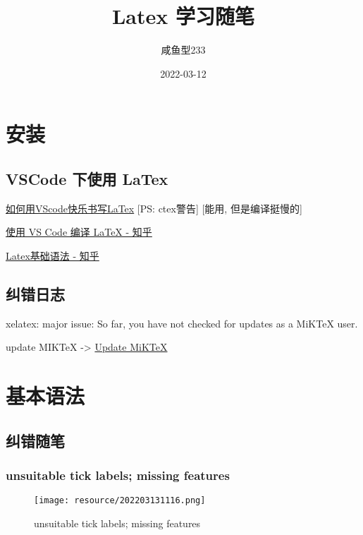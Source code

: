 \documentclass{UJSBachelor} %
\title{Latex 学习随笔}
\author{咸鱼型233}
\date{2022-03-12}
\begin{document}
\maketitle  %
\tableofcontents

\chapter{安装}
\section{VSCode 下使用 LaTex}
\href{https://zhuanlan.zhihu.com/p/337813181}{如何用VScode快乐书写LaTex}
[PS: ctex警告] [能用, 但是编译挺慢的]

\href{https://zhuanlan.zhihu.com/p/382472221}{使用 VS Code 编译 LaTeX - 知乎}

\href{https://zhuanlan.zhihu.com/p/52347414}{Latex基础语法 - 知乎}

\section{纠错日志}

xelatex: major issue: So far, you have not checked for updates as a MiKTeX user.

update MIKTeX -> \href{https://miktex.org/howto/update-miktex}{Update MiKTeX}


\chapter{基本语法}


\section{纠错随笔}

\subsection{unsuitable tick labels; missing features}


\begin{figure}[H]
    \centering
    \texttt{[image: resource/202203131116.png]}
    \caption{unsuitable tick labels; missing features}
\end{figure} 
\end{document}
